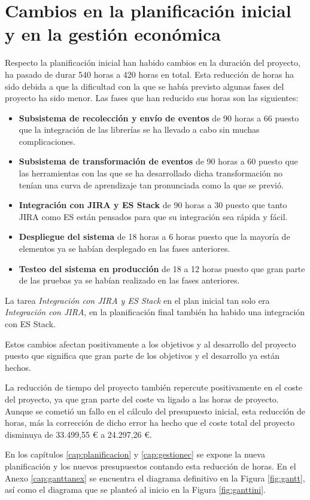 \section{Cambios en la planificación inicial y en la gestión económica}

Respecto la planificación inicial han habido cambios en la duración del proyecto, ha pasado de durar 540 horas a 420 horas en total. Esta reducción de horas ha sido debida a que la dificultad con la que se había previsto algunas fases del proyecto ha sido menor. Las fases que han reducido sus horas son las siguientes:

\begin{itemize}
	\item \textbf{Subsistema de recolección y envío de eventos} de 90 horas a 66 puesto que la integración de las librerías se ha llevado a cabo sin muchas complicaciones.
	
	\item \textbf{Subsistema de transformación de eventos} de 90 horas a 60 puesto que las herramientas con las que se ha desarrollado dicha transformación no tenían una curva de aprendizaje tan pronunciada como la que se previó.
	
	\item \textbf{Integración con JIRA y ES Stack} de 90 horas a 30 puesto que tanto JIRA como ES están pensados para que su integración sea rápida y fácil.
	
	\item \textbf{Despliegue del sistema} de 18 horas a 6 horas puesto que la mayoría de elementos ya se habían desplegado en las fases anteriores.
	
	\item \textbf{Testeo del sistema en producción} de 18 a 12 horas puesto que gran parte de las pruebas ya se habían realizado en las fases anteriores.
\end{itemize}

La tarea \textit{Integración con JIRA y ES Stack} en el plan inicial tan solo era \textit{Integración con JIRA}, en la planificación final también ha habido una integración con ES Stack.

Estos cambios afectan positivamente a los objetivos y al desarrollo del proyecto puesto que significa que gran parte de los objetivos y el desarrollo ya están hechos.

La reducción de tiempo del proyecto también repercute positivamente en el coste del proyecto, ya que gran parte del coste va ligado a las horas de proyecto. Aunque se cometió un fallo en el cálculo del presupuesto inicial, esta reducción de horas, más la corrección de dicho error ha hecho que el coste total del proyecto disminuya de 33.499,55 € a 24.297,26 €.

En los capítulos \ref{cap:planificacion} y \ref{cap:gestionec} se expone la nueva planificación y los nuevos presupuestos contando esta reducción de horas. En el Anexo \ref{cap:ganttanex} se encuentra el diagrama definitivo en la Figura \ref{fig:gantt}, así como el diagrama que se planteó al inicio en la Figura \ref{fig:ganttini}.
